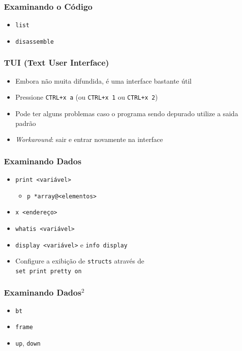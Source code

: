 \documentclass[xcolor=pdftex,dvipsnames,table,t]{beamer}
\begin{document}
\begin{frame}[fragile]
	\frametitle{Examinando o Código}
	  \begin{itemize}
	    \item{\verb|list|}
	    \item{\verb|disassemble|}
	  \end{itemize}
\end{frame}

\begin{frame}[fragile]
	\frametitle{TUI (Text User Interface)}
	  \begin{itemize}
	    \item{Embora não muita difundida, é uma interface bastante útil}
	    \item{Pressione \verb|CTRL+x a| (ou \verb|CTRL+x 1| ou \verb|CTRL+x 2|)}
	    \item{Pode ter alguns problemas caso o programa sendo depurado utilize a saida padrão}
	    \item{\textit{Workaround}: sair e entrar novamente na interface}
	  \end{itemize}
\end{frame}

\begin{frame}[fragile]
	\frametitle{Examinando Dados}
	  \begin{itemize}
	    \item{\verb|print <variável>|}
	    \begin{itemize}
	      \item{\verb|p *array@<elementos>|}
	    \end{itemize}
	    \item{\verb|x <endereço>|}
	    \item{\verb|whatis <variável>|}
	    \item{\verb|display <variável>| e \verb|info display|}
	    \item{Configure a exibição de \verb|structs| através de \\
		  \verb|set print pretty on|}
	  \end{itemize}
\end{frame}

\begin{frame}[fragile]
	\frametitle{Examinando Dados$^2$}
	  \begin{itemize}
	    \item{\verb|bt|}
	    \item{\verb|frame|}
	    \item{\verb|up|, \verb|down|}
	  \end{itemize}
\end{frame}
\end{document}

